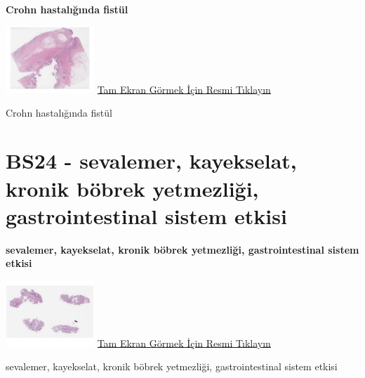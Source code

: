 \documentclass[
  letterpaper,
  DIV=11,
  numbers=noendperiod]{scrreprt}
\begin{document}
\textbf{Crohn hastalığında fistül}

\href{https://images.patolojiatlasi.com/BS23/HE.html}{\includegraphics[width=0.25\textwidth,height=\textheight]{./screenshots/thumbnail_BS23-HE.png}}
\href{https://images.patolojiatlasi.com/BS23/HE.html}{Tam Ekran Görmek
İçin Resmi Tıklayın}

\begin{tcolorbox}[enhanced jigsaw, breakable, opacitybacktitle=0.6, arc=.35mm, colbacktitle=quarto-callout-tip-color!10!white, colback=white, toptitle=1mm, left=2mm, opacityback=0, colframe=quarto-callout-tip-color-frame, titlerule=0mm, rightrule=.15mm, bottomrule=.15mm, toprule=.15mm, bottomtitle=1mm, title=\textcolor{quarto-callout-tip-color}{\faLightbulb}\hspace{0.5em}{Tanı}, coltitle=black, leftrule=.75mm]

Crohn hastalığında fistül

\end{tcolorbox}

\hypertarget{sec-BS24}{%
\section{BS24 - sevalemer, kayekselat, kronik böbrek yetmezliği,
gastrointestinal sistem etkisi}\label{sec-BS24}}

\textbf{sevalemer, kayekselat, kronik böbrek yetmezliği,
gastrointestinal sistem etkisi}

\href{https://images.patolojiatlasi.com/BS24/HE.html}{\includegraphics[width=0.25\textwidth,height=\textheight]{./screenshots/thumbnail_BS24-HE.png}}
\href{https://images.patolojiatlasi.com/BS24/HE.html}{Tam Ekran Görmek
İçin Resmi Tıklayın}

\begin{tcolorbox}[enhanced jigsaw, breakable, opacitybacktitle=0.6, arc=.35mm, colbacktitle=quarto-callout-tip-color!10!white, colback=white, toptitle=1mm, left=2mm, opacityback=0, colframe=quarto-callout-tip-color-frame, titlerule=0mm, rightrule=.15mm, bottomrule=.15mm, toprule=.15mm, bottomtitle=1mm, title=\textcolor{quarto-callout-tip-color}{\faLightbulb}\hspace{0.5em}{Tanı}, coltitle=black, leftrule=.75mm]

sevalemer, kayekselat, kronik böbrek yetmezliği, gastrointestinal sistem
etkisi

\end{tcolorbox}
\end{document}
